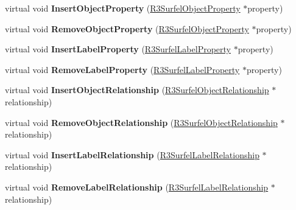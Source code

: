 \begin{DoxyCompactItemize}
\item 
virtual void {\bfseries Insert\+Object\+Property} (\hyperlink{class_r3_surfel_object_property}{R3\+Surfel\+Object\+Property} $\ast$property)\hypertarget{class_r3_surfel_scene_ad9928a09633e9bf0542dc4e76748d4a0}{}\label{class_r3_surfel_scene_ad9928a09633e9bf0542dc4e76748d4a0}

\item 
virtual void {\bfseries Remove\+Object\+Property} (\hyperlink{class_r3_surfel_object_property}{R3\+Surfel\+Object\+Property} $\ast$property)\hypertarget{class_r3_surfel_scene_a8e370f15e72ed99f00a5339f3c919bf5}{}\label{class_r3_surfel_scene_a8e370f15e72ed99f00a5339f3c919bf5}

\item 
virtual void {\bfseries Insert\+Label\+Property} (\hyperlink{class_r3_surfel_label_property}{R3\+Surfel\+Label\+Property} $\ast$property)\hypertarget{class_r3_surfel_scene_a6e4df173fe79288bc50dc832fc5b416f}{}\label{class_r3_surfel_scene_a6e4df173fe79288bc50dc832fc5b416f}

\item 
virtual void {\bfseries Remove\+Label\+Property} (\hyperlink{class_r3_surfel_label_property}{R3\+Surfel\+Label\+Property} $\ast$property)\hypertarget{class_r3_surfel_scene_aac214ba3ffa72a973190a9491a397cb4}{}\label{class_r3_surfel_scene_aac214ba3ffa72a973190a9491a397cb4}

\item 
virtual void {\bfseries Insert\+Object\+Relationship} (\hyperlink{class_r3_surfel_object_relationship}{R3\+Surfel\+Object\+Relationship} $\ast$relationship)\hypertarget{class_r3_surfel_scene_a40a5c1783624fad870c599bd41f1ced2}{}\label{class_r3_surfel_scene_a40a5c1783624fad870c599bd41f1ced2}

\item 
virtual void {\bfseries Remove\+Object\+Relationship} (\hyperlink{class_r3_surfel_object_relationship}{R3\+Surfel\+Object\+Relationship} $\ast$relationship)\hypertarget{class_r3_surfel_scene_a948b3d04d3218963d35de3e61315dd44}{}\label{class_r3_surfel_scene_a948b3d04d3218963d35de3e61315dd44}

\item 
virtual void {\bfseries Insert\+Label\+Relationship} (\hyperlink{class_r3_surfel_label_relationship}{R3\+Surfel\+Label\+Relationship} $\ast$relationship)\hypertarget{class_r3_surfel_scene_a4fe2f7dafecbc074bc649a4650b1476d}{}\label{class_r3_surfel_scene_a4fe2f7dafecbc074bc649a4650b1476d}

\item 
virtual void {\bfseries Remove\+Label\+Relationship} (\hyperlink{class_r3_surfel_label_relationship}{R3\+Surfel\+Label\+Relationship} $\ast$relationship)\hypertarget{class_r3_surfel_scene_a99be6c1d7776aca09d59d041d73cb6e3}{}\label{class_r3_surfel_scene_a99be6c1d7776aca09d59d041d73cb6e3}


\end{DoxyCompactItemize}
